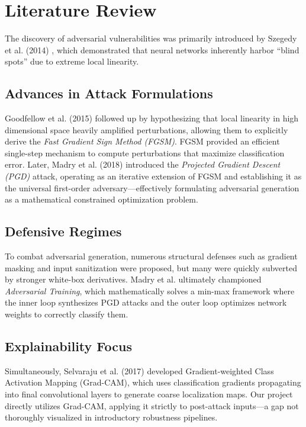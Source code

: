 \documentclass[12pt,a4paper]{article}
\begin{document}
\section{Literature Review}
The discovery of adversarial vulnerabilities was primarily introduced by Szegedy et al. (2014) \cite{szegedy2013intriguing}, which demonstrated that neural networks inherently harbor ``blind spots'' due to extreme local linearity.

\subsection{Advances in Attack Formulations}
Goodfellow et al. (2015) \cite{goodfellow2014explaining} followed up by hypothesizing that local linearity in high dimensional space heavily amplified perturbations, allowing them to explicitly derive the \textit{Fast Gradient Sign Method (FGSM)}. FGSM provided an efficient single-step mechanism to compute perturbations that maximize classification error.
Later, Madry et al. (2018) \cite{madry2017towards} introduced the \textit{Projected Gradient Descent (PGD)} attack, operating as an iterative extension of FGSM and establishing it as the universal first-order adversary—effectively formulating adversarial generation as a mathematical constrained optimization problem.

\subsection{Defensive Regimes}
To combat adversarial generation, numerous structural defenses such as gradient masking and input sanitization were proposed, but many were quickly subverted by stronger white-box derivatives. Madry et al. ultimately championed \textit{Adversarial Training}, which mathematically solves a min-max framework where the inner loop synthesizes PGD attacks and the outer loop optimizes network weights to correctly classify them. 

\subsection{Explainability Focus}
Simultaneously, Selvaraju et al. (2017) \cite{selvaraju2017grad} developed Gradient-weighted Class Activation Mapping (Grad-CAM), which uses classification gradients propagating into final convolutional layers to generate coarse localization maps. Our project directly utilizes Grad-CAM, applying it strictly to post-attack inputs—a gap not thoroughly visualized in introductory robustness pipelines.
\end{document}
